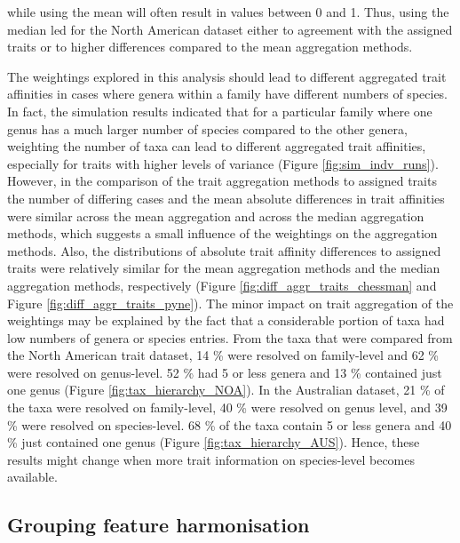 \documentclass{article}
\begin{document}
while using the mean will often result in values between 0 and 1. Thus, using the median led for the North American dataset either to agreement with the assigned traits or to higher differences compared to the mean aggregation methods. 

The weightings explored in this analysis should lead to different aggregated trait affinities in cases where genera within a family have different numbers of species. In fact, the simulation results indicated that for a particular family where one genus has a much larger number of species compared to the other genera, weighting the number of taxa can lead to different aggregated trait affinities, especially for traits with higher levels of variance (Figure \ref{fig:sim_indv_runs}). However, in the comparison of the trait aggregation methods to assigned traits the number of differing cases and the mean absolute differences in trait affinities were similar across the mean aggregation and across the median aggregation methods, which suggests a small influence of the weightings on the aggregation methods. Also, the distributions of absolute trait affinity differences to assigned traits were relatively similar for the mean aggregation methods and the median aggregation methods, respectively (Figure \ref{fig:diff_aggr_traits_chessman} and Figure \ref{fig:diff_aggr_traits_pyne}). The minor impact on trait aggregation of the weightings may be explained by the fact that a considerable portion of taxa had low numbers of genera or species entries. From the taxa that were compared from the North American trait dataset, 14 \% were resolved on family-level and 62 \% were resolved on genus-level. 52 \% had 5 or less genera and 13 \% contained just one genus (Figure \ref{fig:tax_hierarchy_NOA}). In the Australian dataset, 21 \% of the taxa were resolved on family-level, 40 \% were resolved on genus level, and 39 \% were resolved on species-level. 68 \% of the taxa contain 5 or less genera and 40 \% just contained one genus (Figure \ref{fig:tax_hierarchy_AUS}). Hence, these results might change when more trait information on species-level becomes available. 

\subsection*{Grouping feature harmonisation}
\end{document}
